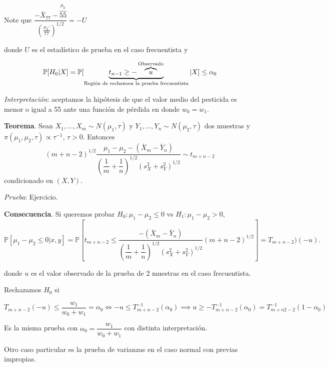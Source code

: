 \documentclass[
  12pt,
]{book}
\begin{document}
Note que \(\dfrac{-\bar X_{77}-\overbrace{55}^{\mu_0} }{\left(\frac{\sigma_2'}{77}\right)^{1/2}} = -U\)

donde \(U\) es el estadístico de prueba en el caso frecuentista y

\[\mathbb P[H_0|X] = \mathbb P[\underbrace{t_{n-1}\geq -\overbrace{u}^{\text{Observado}}}_{\text{Región de rechazo}\\\text{en la prueba frecuentista}}|X]\leq \alpha_0\]

\emph{Interpretación}: aceptamos la hipótesis de que el valor medio del pesticida es menor o igual a 55 ante una función de pérdida en donde \(w_0 = w_1\).

\textbf{Teorema}. Sean \(X_1,\dots,X_m\sim N(\mu_1,\tau)\) y \(Y_1,\dots, Y_n\sim N(\mu_2,\tau)\) dos muestras y \(\pi(\mu_1,\mu_2,\tau)\propto \tau^{-1}\), \(\tau > 0\). Entonces
\[(m+n-2)^{1/2}\dfrac{\mu_1-\mu_2-(\bar X_{m}-\bar Y_n)}{\left(\dfrac 1m + \dfrac 1n\right)^{1/2}(s_X^2+s_Y^2)^{1/2}}\sim t_{m+n-2}\]
condicionado en \((X,Y)\).

\emph{Prueba}: Ejercicio.

\textbf{Consecuencia}. Si queremos probar \(H_0: \mu_1-\mu_2\leq 0\) vs \(H_1:\mu_1-\mu_2>0\),
\[\mathbb P[\mu_1-\mu_2\leq 0|x,y] = \mathbb P\left[t_{m+n-2}\leq \dfrac{-(\bar X_m-\bar Y_n)}{\left(\dfrac 1m + \dfrac 1n\right)^{1/2}(s_X^2+s_Y^2)^{1/2}}(m+n-2)^{1/2}\right] = T_{m+n-2})(-u).\]

donde \(u\) es el valor observado de la prueba de 2 muestras en el caso frecuentista.

Rechazamos \(H_0\) si

\[ T_{m+n-2}(-u)\leq \dfrac{w_1}{w_0+w_1}=\alpha_0 \Leftrightarrow -u\leq T_{m+n-2}^{-1}(\alpha_0) \implies u\geq -T_{m+n-2}^{-1}(\alpha_0) = T_{m+n2-2}^{-1}(1-\alpha_0)\]

Es la misma prueba con \(\alpha_0 = \dfrac{w_1}{w_0+w_1}\) con distinta interpretación.

Otro caso particular es la prueba de varianzas en el caso normal con previas impropias.

\printbibliography
\end{document}
